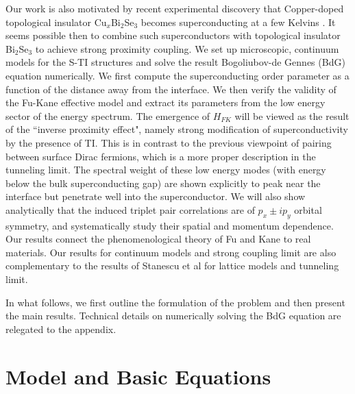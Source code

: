 Our work is also motivated by recent experimental discovery that Copper-doped 
topological insulator Cu$_x$Bi$_2$Se$_3$
becomes superconducting at a few Kelvins \cite{cu1,cu2,ando}. It 
seems possible then to combine such superconductors with topological insulator 
Bi$_2$Se$_3$ to achieve strong proximity coupling. 
We set up microscopic, continuum models for the S-TI structures and solve the result 
Bogoliubov-de Gennes (BdG) equation numerically.
We first compute the superconducting order 
parameter as a function of the distance
away from the interface.
We then verify the validity of the Fu-Kane effective model
and extract its parameters from the low energy sector of the energy
spectrum. The emergence
of $H_{FK}$ will be viewed as the result of the ``inverse proximity effect", namely
strong modification of superconductivity by the presence of TI.
This is in contrast to the previous viewpoint of
pairing between surface Dirac fermions, which is a more proper description
in the tunneling limit.
The spectral weight of these low energy modes (with energy below the bulk superconducting gap) 
are shown explicitly to peak near the interface but penetrate well
into the superconductor.
We will also show analytically that the induced triplet pair
correlations are of $p_x\pm ip_y$ orbital symmetry, and systematically
study their spatial and momentum dependence.
Our results connect the phenomenological theory of Fu and Kane \cite{f-k}
to real materials. Our results for continuum models and strong coupling 
limit are also complementary to the results of Stanescu et al \cite{stan}
for lattice models and tunneling limit.

In what follows, we first outline the formulation of the problem and 
then present the main results. Technical details on numerically solving
the BdG equation are relegated to the appendix.

\section{Model and Basic Equations}

